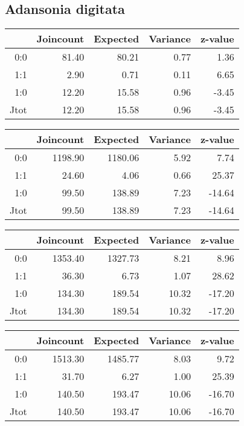 \documentclass[a4paper, oneside, 12pt]{book}
\begin{document}
\subsection{Adansonia digitata}
\begin{table}[H]
	\centering
	\begin{tabular}{rrrrr}
		\hline
		& Joincount & Expected & Variance & z-value \\ 
		\hline
		0:0 & 81.40 & 80.21 & 0.77 & 1.36 \\ 
		1:1 & 2.90 & 0.71 & 0.11 & 6.65 \\ 
		1:0 & 12.20 & 15.58 & 0.96 & -3.45 \\ 
		Jtot & 12.20 & 15.58 & 0.96 & -3.45 \\ 
		\hline
	\end{tabular}
\end{table}
\begin{table}[H]
	\centering
	\begin{tabular}{rrrrr}
		\hline
		& Joincount & Expected & Variance & z-value \\ 
		\hline
		0:0 & 1198.90 & 1180.06 & 5.92 & 7.74 \\ 
		1:1 & 24.60 & 4.06 & 0.66 & 25.37 \\ 
		1:0 & 99.50 & 138.89 & 7.23 & -14.64 \\ 
		Jtot & 99.50 & 138.89 & 7.23 & -14.64 \\ 
		\hline
	\end{tabular}
\end{table}
\begin{table}[H]
	\centering
	\begin{tabular}{rrrrr}
		\hline
		& Joincount & Expected & Variance & z-value \\ 
		\hline
		0:0 & 1353.40 & 1327.73 & 8.21 & 8.96 \\ 
		1:1 & 36.30 & 6.73 & 1.07 & 28.62 \\ 
		1:0 & 134.30 & 189.54 & 10.32 & -17.20 \\ 
		Jtot & 134.30 & 189.54 & 10.32 & -17.20 \\ 
		\hline
	\end{tabular}
\end{table}
\begin{table}[H]
	\centering
	\begin{tabular}{rrrrr}
		\hline
		& Joincount & Expected & Variance & z-value \\ 
		\hline
		0:0 & 1513.30 & 1485.77 & 8.03 & 9.72 \\ 
		1:1 & 31.70 & 6.27 & 1.00 & 25.39 \\ 
		1:0 & 140.50 & 193.47 & 10.06 & -16.70 \\ 
		Jtot & 140.50 & 193.47 & 10.06 & -16.70 \\ 
		\hline
	\end{tabular}
\end{table}
\end{document}
